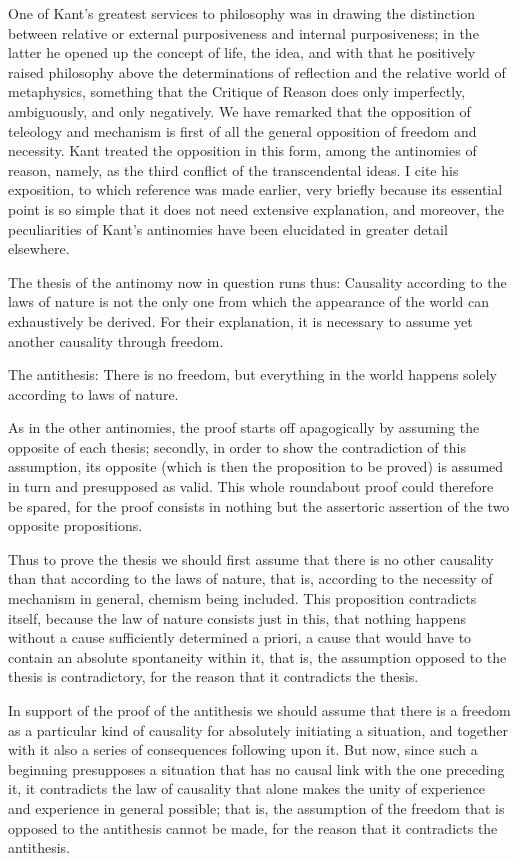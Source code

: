 One of Kant's greatest services to philosophy was
in drawing the distinction between relative or
external purposiveness and internal purposiveness;
in the latter he opened up the concept of life, the idea,
and with that he positively raised philosophy
above the determinations of reflection
and the relative world of metaphysics,
something that the Critique of Reason does
only imperfectly, ambiguously, and only negatively.
We have remarked that the opposition of teleology and mechanism is
first of all the general opposition of freedom and necessity.
Kant treated the opposition in this form, among the antinomies of reason,
namely, as the third conflict of the transcendental ideas.
I cite his exposition, to which reference was made earlier,
very briefly because its essential point is so simple
that it does not need extensive explanation,
and moreover, the peculiarities of Kant's antinomies
have been elucidated in greater detail elsewhere.

The thesis of the antinomy now in question runs thus:
Causality according to the laws of nature is
not the only one from which the appearance of
the world can exhaustively be derived.
For their explanation, it is necessary to
assume yet another causality through freedom.

The antithesis: There is no freedom,
but everything in the world happens
solely according to laws of nature.

As in the other antinomies, the proof starts off apagogically
by assuming the opposite of each thesis;
secondly, in order to show the contradiction of this assumption,
its opposite (which is then the proposition to be proved)
is assumed in turn and presupposed as valid.
This whole roundabout proof could therefore be spared,
for the proof consists in nothing but the assertoric
assertion of the two opposite propositions.

Thus to prove the thesis we should first assume
that there is no other causality than
that according to the laws of nature, that is,
according to the necessity of mechanism in general, chemism being included.
This proposition contradicts itself,
because the law of nature consists just in this,
that nothing happens without a cause sufficiently determined a priori,
a cause that would have to contain an absolute spontaneity within it,
that is, the assumption opposed to the thesis is contradictory,
for the reason that it contradicts the thesis.

In support of the proof of the antithesis
we should assume that there is a freedom
as a particular kind of causality
for absolutely initiating a situation,
and together with it also a series of
consequences following upon it.
But now, since such a beginning presupposes
a situation that has no causal link with the one preceding it,
it contradicts the law of causality that alone makes the unity
of experience and experience in general possible;
that is, the assumption of the freedom
that is opposed to the antithesis cannot be made,
for the reason that it contradicts the antithesis.


